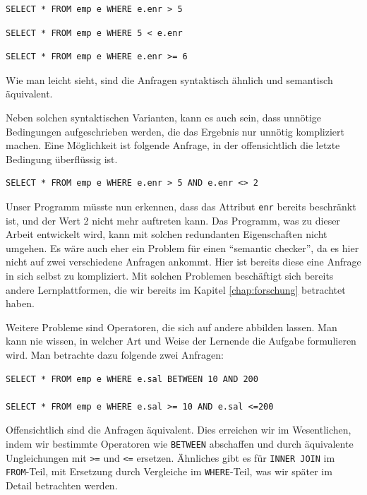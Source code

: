\begin{verbatim}
SELECT * FROM emp e WHERE e.enr > 5
\end{verbatim}

\begin{verbatim}
SELECT * FROM emp e WHERE 5 < e.enr
\end{verbatim}

\begin{verbatim}
SELECT * FROM emp e WHERE e.enr >= 6
\end{verbatim}

Wie man leicht sieht, sind die Anfragen syntaktisch ähnlich und semantisch äquivalent. 

Neben solchen syntaktischen Varianten, kann es auch sein, dass unnötige Bedingungen aufgeschrieben werden, die das Ergebnis nur unnötig kompliziert machen. Eine Möglichkeit ist folgende Anfrage, in der offensichtlich die letzte Bedingung überflüssig ist.
\begin{verbatim}
SELECT * FROM emp e WHERE e.enr > 5 AND e.enr <> 2
\end{verbatim}

Unser Programm müsste nun erkennen, dass das Attribut \verb|enr| bereits beschränkt ist, und der Wert 2 nicht mehr auftreten kann. Das Programm, was zu dieser Arbeit entwickelt wird, kann mit solchen redundanten Eigenschaften nicht umgehen. Es wäre auch eher ein Problem für einen ``semantic checker'', da es hier nicht auf zwei verschiedene Anfragen ankommt. Hier ist bereits diese eine Anfrage in sich selbst zu kompliziert. Mit solchen Problemen beschäftigt sich bereits andere Lernplattformen, die wir bereits im Kapitel \ref{chap:forschung} betrachtet haben.

Weitere Probleme sind Operatoren, die sich auf andere abbilden lassen. Man kann nie wissen, in welcher Art und Weise der Lernende die Aufgabe formulieren wird. Man betrachte dazu folgende zwei Anfragen:
\begin{verbatim}
SELECT * FROM emp e WHERE e.sal BETWEEN 10 AND 200

SELECT * FROM emp e WHERE e.sal >= 10 AND e.sal <=200
\end{verbatim}

Offensichtlich sind die Anfragen äquivalent. Dies erreichen wir im Wesentlichen, indem wir bestimmte Operatoren wie \verb|BETWEEN| abschaffen und durch äquivalente Ungleichungen mit \verb|>=| und \verb|<=| ersetzen. Ähnliches gibt es für \verb|INNER JOIN| im \verb|FROM|-Teil, mit Ersetzung durch Vergleiche im \verb|WHERE|-Teil, was wir später im Detail betrachten werden.

